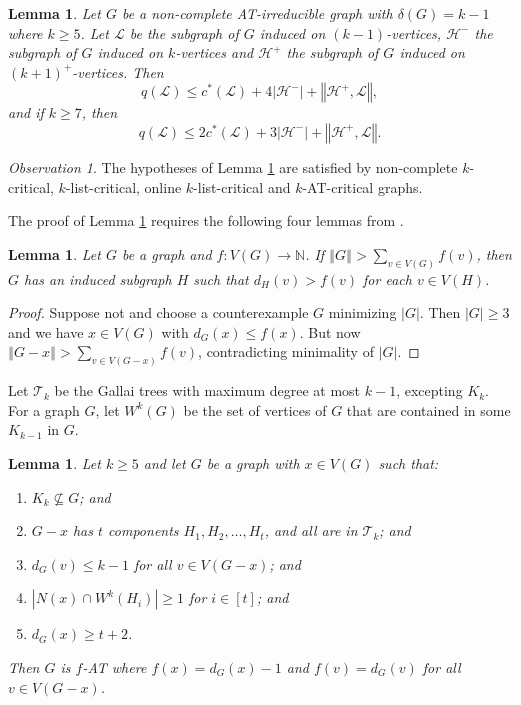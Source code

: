 \documentclass[10pt]{article}
\renewcommand{\leq}{\leqslant}
\renewcommand{\ge}{\geqslant}
\renewcommand{\le}{\leqslant}
\theoremstyle{plain}
\newtheorem{lem}[thm]{Lemma}
\theoremstyle{definition}
\theoremstyle{remark}
\newtheorem*{observation}{Observation}
\newcommand{\fancy}[1]{\mathcal{#1}}
\newcommand{\IN}{\mathbb{N}}
\newcommand{\T}{\fancy{T}}
\renewcommand{\L}{\fancy{L}}
\newcommand{\HH}{\fancy{H}}
\newcommand{\card}[1]{\left|#1\right|}
\newcommand{\size}[1]{\left\Vert#1\right\Vert}
\newcommand{\func}[3]{#1\colon #2 \rightarrow #3}
\newcommand{\irange}[1]{\left[#1\right]}
\begin{document}
\begin{lem}\label{qLemma}
	Let $G$ be a non-complete AT-irreducible graph with $\delta(G) = k-1$ where $k \ge 5$.  Let $\L$ be the subgraph of $G$ induced on $(k-1)$-vertices, $\HH^-$ the subgraph of $G$ induced on $k$-vertices and 
	$\HH^+$ the subgraph of $G$ induced on $(k+1)^+$-vertices.  Then
	\[q(\L) \le c^*(\L) + 4\card{\HH^-} + \size{\HH^+, \L},\] and if $k \ge 7$, then
	\[q(\L) \le 2c^*(\L) + 3\card{\HH^-} + \size{\HH^+, \L}.\]
\end{lem}

\begin{observation}
The hypotheses of Lemma \ref{qLemma} are satisfied by non-complete $k$-critical, $k$-list-critical, online $k$-list-critical and $k$-AT-critical graphs.
\end{observation}

The proof of Lemma \ref{qLemma} requires the following four lemmas from \cite{OreVizing}.

\begin{lem}\label{DegenerateEuler}
Let $G$ be a graph and $\func{f}{V(G)}{\IN}$.  If $\size{G} > \sum_{v \in V(G)} f(v)$, then $G$ has an induced subgraph $H$ such that $d_H(v) > f(v)$ for each $v \in V(H)$.
\end{lem}
\begin{proof}
Suppose not and choose a counterexample $G$ minimizing $\card{G}$. Then $\card{G} \ge 3$ and we have $x \in V(G)$ with $d_G(x) \leq f(x)$. But now $\size{G-x} > \sum_{v \in V(G-x)} f(v)$, contradicting minimality of $\card{G}$.
\end{proof}

Let $\T_k$ be the Gallai trees with maximum degree at most $k-1$, excepting $K_k$. For a graph $G$, let $W^k(G)$ be the set of vertices of $G$ that are contained in some $K_{k-1}$ in $G$.  

\begin{lem}\label{ConfigurationTypeOneEuler}
Let $k \ge 5$ and let $G$ be a graph with $x \in V(G)$ such that:
\begin{enumerate}
\item $K_k \not \subseteq G$; and
\item $G-x$ has $t$ components $H_1, H_2, \ldots, H_t$, and all are in $\T_k$; and
\item $d_G(v) \leq k - 1$ for all $v \in V(G-x)$; and
\item $\card{N(x) \cap W^k(H_i)} \ge 1$ for $i \in \irange{t}$; and
\item $d_G(x) \ge t+2$.
\end{enumerate}

\noindent Then $G$ is $f$-AT where $f(x) = d_G(x) - 1$ and $f(v) = d_G(v)$ for all $v \in V(G - x)$.
\end{lem}
\end{document}
